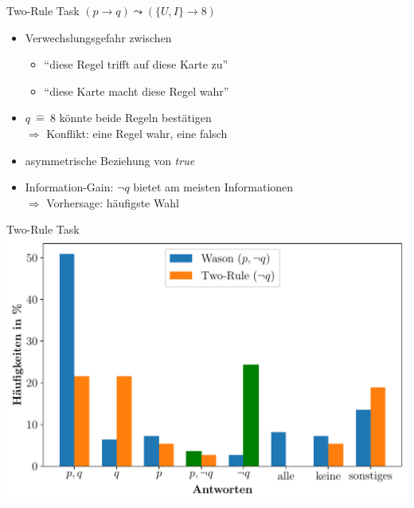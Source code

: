 \begin{frame}{Two-Rule Task {\scriptsize \cite[S.~102-104]{stenningHumanReasoningCognitive2008}}}
    $(p \to q) \leadsto (\{U, I\} \to 8)$

    \begin{itemize}
        \item Verwechslungsgefahr zwischen
        \begin{itemize}
            \item \enquote{diese Regel trifft auf diese Karte zu}
            \item \enquote{diese Karte macht diese Regel wahr}
        \end{itemize}
        
        \item $q~\hat=~8$ könnte beide Regeln bestätigen \\
            $\Rightarrow$ Konflikt: eine Regel wahr, eine falsch
        
        \item asymmetrische Beziehung von \emph{true}
        
        \item Information-Gain: $\lnot q$ bietet am meisten Informationen \\
            $\Rightarrow$ Vorhersage: häufigste Wahl
    \end{itemize}
\end{frame}


\begin{frame}{Two-Rule Task {\scriptsize \cite[S.~109]{stenningHumanReasoningCognitive2008}}}
    \includegraphics[width=\textwidth]{../plot/results_two_rule.pdf}
\end{frame}


